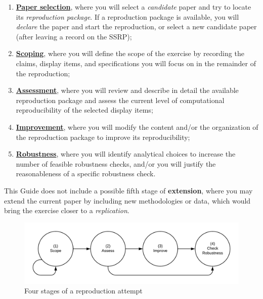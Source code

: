 \documentclass[
  openany]{book}
\providecommand{\tightlist}{%
  \setlength{\itemsep}{0pt}\setlength{\parskip}{0pt}}
\begin{document}
\begin{enumerate}
\def\labelenumi{\arabic{enumi}.}
\setcounter{enumi}{-1}
\tightlist
\item
  \protect\hyperlink{select}{\textbf{Paper selection}}, where you will select a \emph{candidate} paper and try to locate its \emph{reproduction package}. If a reproduction package is available, you will \emph{declare} the paper and start the reproduction, or select a new candidate paper (after leaving a record on the SSRP);\\
\item
  \protect\hyperlink{scoping}{\textbf{Scoping}}, where you will define the scope of the exercise by recording the claims, display items, and specifications you will focus on in the remainder of the reproduction;\\
\item
  \protect\hyperlink{assessment}{\textbf{Assessment}}, where you will review and describe in detail the available reproduction package and assess the current level of computational reproducibility of the selected display items;
\item
  \protect\hyperlink{improvements}{\textbf{Improvement}}, where you will modify the content and/or the organization of the reproduction package to improve its reproducibility;\\
\item
  \protect\hyperlink{robust}{\textbf{Robustness}}, where you will identify analytical choices to increase the number of feasible robustness checks, and/or you will justify the reasonableness of a specific robustness check.
\end{enumerate}

This Guide does not include a possible fifth stage of \textbf{extension}, where you may extend the current paper by including new methodologies or data, which would bring the exercise closer to a \emph{replication}.

\begin{figure}
\includegraphics[width=1\linewidth]{stages} \caption{Four stages of a reproduction attempt}\label{fig:stages-intro}
\end{figure}
\end{document}
